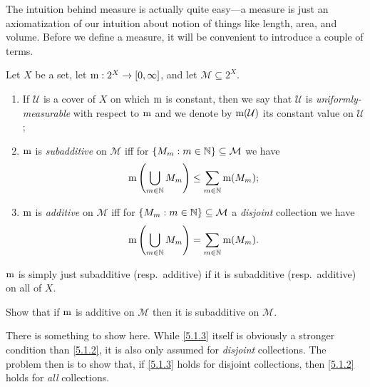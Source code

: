 The intuition behind measure is actually quite easy---a measure is just an axiomatization of our intuition about notion of things like length, area, and volume.  Before we define a measure, it will be convenient to introduce a couple of terms.
\begin{dfn}
Let $X$ be a set, let $\mathrm{m} :2^X\rightarrow [0,\infty ]$, and let $\mathcal{M}\subseteq 2^X$.  
\begin{enumerate}
\item If $\mathcal{U}$ is a cover of $X$ on which $\mathrm{m}$ is constant, then we say that $\mathcal{U}$ is \emph{uniformly-measurable} with respect to $\mathrm{m}$ and we denote by $\mathrm{m} (\mathcal{U})$ its constant value on $\mathcal{U}$;
\item $\mathrm{m}$ is \emph{subadditive} on $\mathcal{M}$ iff for $\{ M_m:m\in \mathbb{N} \} \subseteq \mathcal{M}$ we have
\begin{equation}\label{5.1.2}
\mathrm{m} \left( \bigcup _{m\in \mathbb{N}}M_m\right) \leq \sum _{m\in \mathbb{N}}\mathrm{m} (M_m);
\end{equation}
\item $\mathrm{m}$ is \emph{additive} on $\mathcal{M}$ iff for $\{ M_m:m\in \mathbb{N} \} \subseteq \mathcal{M}$ a \emph{disjoint} collection we have
\begin{equation}\label{5.1.3}
\mathrm{m} \left( \bigcup _{m\in \mathbb{N}}M_m\right) =\sum _{m\in \mathbb{N}}\mathrm{m} (M_m).
\end{equation}
\end{enumerate}
$\mathrm{m}$ is simply just subadditive (resp.~additive) if it is subadditive (resp.~additive) on all of $X$.
\end{dfn}
\begin{exr}\label{exr5.1.4}
Show that if $\mathrm{m}$ is additive on $\mathcal{M}$ then it is subadditive on $\mathcal{M}$.
\begin{rmk}
There is something to show here.  While \eqref{5.1.3} itself is obviously a stronger condition than \eqref{5.1.2}, it is also only assumed for \emph{disjoint} collections.  The problem then is to show that, if \eqref{5.1.3} holds for disjoint collections, then \eqref{5.1.2} holds for \emph{all} collections.
\end{rmk}
\end{exr}
